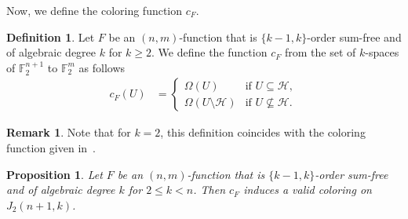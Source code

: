 \documentclass[12pt]{article}
\newtheorem{prop}[thm]{Proposition}
\theoremstyle{definition}
\newtheorem{defn}[thm]{Definition}
\newtheorem*{remark}{Remark}
\newcommand{\HH}{\mathcal{H}}
\newcommand{\F}{\mathbb F}
\begin{document}
Now, we define the coloring function $c_F$.

\begin{defn} \label{D: coloring function}
     Let $F$ be an $(n,m)$-function that is $\{k-1,k\}$-order sum-free and of algebraic degree $k$ for $k\geq 2$. We define the function $c_F$ from the set of $k$-spaces of $\F_{2}^{n+1}$ to $\F_2^m$ as follows
 \begin{align*}
c_F(U) &=
\begin{cases}
\Omega(U) & \text{if } U\subseteq \HH, \\
\Omega(U\setminus \HH) & \text{if } U\not\subseteq \HH.
\end{cases}
\end{align*}
\end{defn}

\begin{remark}
Note that for $k = 2$, this definition coincides with the coloring function given in~\cite{heering2025lineparallelismspgn2preparatalike}.
\end{remark}


\begin{prop} \label{P: constructive Prove of Them 5.1} 
   Let $F$ be an $(n,m)$-function that is $\{k-1,k\}$-order sum-free and of algebraic degree $k$ for $2\leq k<n$. Then $c_F$ induces a valid coloring on $J_2(n+1,k)$.
\end{prop} 
\end{document}
